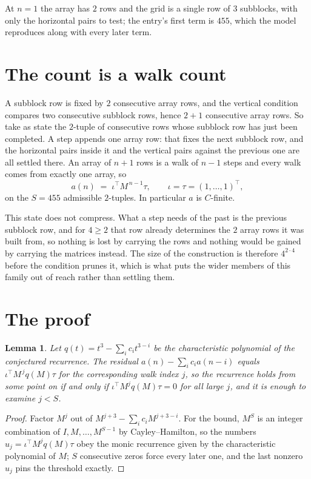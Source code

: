 \documentclass[11pt,a4paper]{article}
\theoremstyle{plain}
\newtheorem{lemma}[theorem]{Lemma}
\theoremstyle{definition}
\begin{document}
At $n=1$ the array has $2$ rows and the grid is a single row of $3$
subblocks, with only the horizontal pairs to test; the entry's first term is
$455$, which the model reproduces along with every later term.

\section{The count is a walk count}

A subblock row is fixed by $2$ consecutive array rows, and the vertical condition compares
two consecutive subblock rows, hence $2+1$ consecutive array rows. So take as state the
$2$-tuple of consecutive rows whose subblock row has just been completed. A step appends one
array row: that fixes the next subblock row, and the horizontal pairs inside it and the
vertical pairs against the previous one are all settled there. An array of $n+1$ rows is
a walk of $n-1$ steps and every walk comes from exactly one array, so
\[
a(n)\;=\;\iota^{\!\top}M^{\,n-1}\tau,\qquad\iota=\tau=(1,\dots,1)^{\!\top},
\]
on the $S=455$ admissible $2$-tuples. In particular $a$ is $C$-finite.

This state does not compress. What a step needs of the past is the previous subblock row, and
for $4\ge2$ that row already determines the $2$ array rows it was built from, so nothing
is lost by carrying the rows and nothing would be gained by carrying the matrices instead. The
size of the construction is therefore $4^{2\cdot4}$ before the condition prunes
it, which is what puts the wider members of this family out of reach rather than settling them.

\section{The proof}

\begin{lemma}\label{lem:crit}
Let $q(t)=t^{3}-\sum_i c_it^{3-i}$ be the characteristic polynomial of the
conjectured recurrence. The residual $a(n)-\sum_ic_ia(n-i)$ equals
$\iota^{\!\top}M^{\,j}q(M)\tau$ for the corresponding walk index $j$, so the recurrence
holds from some point on if and only if $\iota^{\!\top}M^{j}q(M)\tau=0$ for all large $j$,
and it is enough to examine $j<S$.
\end{lemma}

\begin{proof}
Factor $M^{j}$ out of $M^{j+3}-\sum_ic_iM^{j+3-i}$. For the bound, $M^{S}$
is an integer combination of $I,M,\dots,M^{S-1}$ by Cayley--Hamilton, so the numbers
$u_j=\iota^{\!\top}M^{j}q(M)\tau$ obey the monic recurrence given by the characteristic
polynomial of $M$; $S$ consecutive zeros force every later one, and the last nonzero $u_j$
pins the threshold exactly.
\end{proof}
\end{document}
